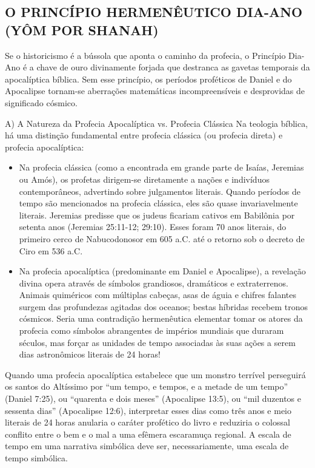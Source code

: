 \subsection{O PRINCÍPIO HERMENÊUTICO DIA-ANO (YÔM POR SHANAH)}


Se o historicismo é a bússola que aponta o caminho da profecia, o Princípio Dia-Ano é a chave de ouro divinamente forjada que destranca as gavetas temporais da apocalíptica bíblica. Sem esse princípio, os períodos proféticos de Daniel e do Apocalipse tornam-se aberrações matemáticas incompreensíveis e desprovidas de significado cósmico.

A) A Natureza da Profecia Apocalíptica vs. Profecia Clássica
Na teologia bíblica, há uma distinção fundamental entre profecia clássica (ou profecia direta) e profecia apocalíptica:
\begin{itemize}
  \item Na profecia clássica (como a encontrada em grande parte de Isaías, Jeremias ou Amós), os profetas dirigem-se diretamente a nações e indivíduos contemporâneos, advertindo sobre julgamentos literais. Quando períodos de tempo são mencionados na profecia clássica, eles são quase invariavelmente literais. Jeremias predisse que os judeus ficariam cativos em Babilônia por setenta anos (Jeremias 25:11-12; 29:10). Esses foram 70 anos literais, do primeiro cerco de Nabucodonosor em 605 a.C. até o retorno sob o decreto de Ciro em 536 a.C.
  \item Na profecia apocalíptica (predominante em Daniel e Apocalipse), a revelação divina opera através de símbolos grandiosos, dramáticos e extraterrenos. Animais quiméricos com múltiplas cabeças, asas de águia e chifres falantes surgem das profundezas agitadas dos oceanos; bestas híbridas recebem tronos cósmicos. Seria uma contradição hermenêutica elementar tomar os atores da profecia como símbolos abrangentes de impérios mundiais que duraram séculos, mas forçar as unidades de tempo associadas às suas ações a serem dias astronômicos literais de 24 horas!
\end{itemize}


Quando uma profecia apocalíptica estabelece que um monstro terrível perseguirá os santos do Altíssimo por ``um tempo, e tempos, e a metade de um tempo'' (Daniel 7:25), ou ``quarenta e dois meses'' (Apocalipse 13:5), ou ``mil duzentos e sessenta dias'' (Apocalipse 12:6), interpretar esses dias como três anos e meio literais de 24 horas anularia o caráter profético do livro e reduziria o colossal conflito entre o bem e o mal a uma efêmera escaramuça regional. A escala de tempo em uma narrativa simbólica deve ser, necessariamente, uma escala de tempo simbólica.

